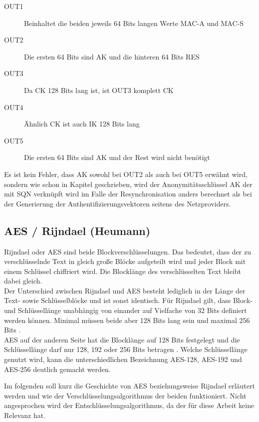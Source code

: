  \begin{description}
  \item [OUT1] Beinhaltet die beiden jeweils 64 Bits langen Werte MAC-A und MAC-S
  \item [OUT2] Die ersten 64 Bits sind AK und die hinteren 64 Bits RES
  \item [OUT3] Da CK 128 Bits lang ist, ist OUT3 komplett CK
  \item [OUT4] Ähnlich CK ist auch IK 128 Bits lang
  \item [OUT5] Die ersten 64 Bits sind AK und der Rest wird nicht benötigt
 \end{description}
 
 Es ist kein Fehler, dass AK sowohl bei OUT2 als auch bei OUT5 erwähnt wird, sondern
 wie schon in Kapitel  geschrieben, wird
 der Anonymitätsschlüssel AK der mit SQN verknüpft wird im Falle der Resynchronisation
 anders berechnet als bei der Generierung der Authentifizierungsvektoren seitens des
 Netzproviders.
 
\subsection{AES / Rijndael (Heumann)}
\label{aes}
 Rijndael oder \ac{AES} sind beide Blockverschlüsselungen. Das bedeutet, dass der zu
 verschlüsselnde Text in gleich große Blöcke aufgeteilt wird und jeder Block mit einem Schlüssel
 chiffriert wird. Die Blocklänge des verschlüsselten Text bleibt dabei gleich. \\
 Der Unterschied zwischen Rijndael und AES besteht lediglich in der Länge der Text- sowie
 Schlüsselblöcke und ist sonst identisch. Für Rijndael gilt, dass Block- und Schlüssellänge
 unabhängig von einander auf Vielfache von 32 Bits definiert werden können. Minimal müssen
 beide aber 128 Bits lang sein und maximal 256 Bits \cite{daemon02}. \\ %
 AES auf der anderen Seite hat die Blocklänge auf 128 Bits festgelegt und die Schlüssel\-länge
 darf nur 128, 192 oder 256 Bits betragen \cite{AES-FIPS}. Welche Schlüssel\-länge genutzt
 wird, kann die unterschiedlichen Bezeichnung AES-128, AES-192 und AES-256 deutlich gemacht
 werden.
 
 Im folgenden soll kurz die Geschichte von AES beziehungsweise Rijndael erläutert werden und
 wie der Verschlüsselungs\-algorithmus der beiden funktioniert. Nicht angesprochen wird der
 Entschlüsselungs\-algorithmus, da der für diese Arbeit keine Relevanz hat.
 
